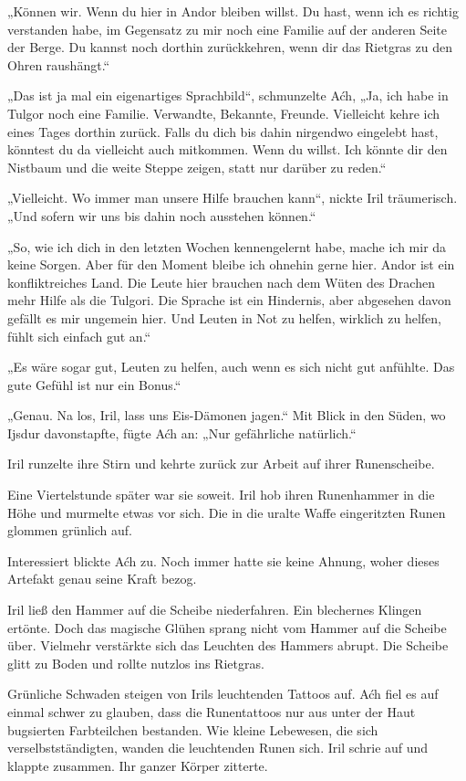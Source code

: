 „Können wir. Wenn du hier in Andor bleiben willst. Du hast, wenn ich es richtig verstanden habe, im Gegensatz zu mir noch eine Familie auf der anderen Seite der Berge. Du kannst noch dorthin zurückkehren, wenn dir das Rietgras zu den Ohren raushängt.“

„Das ist ja mal ein eigenartiges Sprachbild“, schmunzelte Aćh, „Ja, ich habe in Tulgor noch eine Familie. Verwandte, Bekannte, Freunde. Vielleicht kehre ich eines Tages dorthin zurück. Falls du dich bis dahin nirgendwo eingelebt hast, könntest du da vielleicht auch mitkommen. Wenn du willst. Ich könnte dir den Nistbaum und die weite Steppe zeigen, statt nur darüber zu reden.“

„Vielleicht. Wo immer man unsere Hilfe brauchen kann“, nickte Iril träumerisch. „Und sofern wir uns bis dahin noch ausstehen können.“

„So, wie ich dich in den letzten Wochen kennengelernt habe, mache ich mir da keine Sorgen. Aber für den Moment bleibe ich ohnehin gerne hier. Andor ist ein konfliktreiches Land. Die Leute hier brauchen nach dem Wüten des Drachen mehr Hilfe als die Tulgori. Die Sprache ist ein Hindernis, aber abgesehen davon gefällt es mir ungemein hier. Und Leuten in Not zu helfen, wirklich zu helfen, fühlt sich einfach gut an.“

„Es wäre sogar gut, Leuten zu helfen, auch wenn es sich nicht gut anfühlte. Das gute Gefühl ist nur ein Bonus.“

„Genau. Na los, Iril, lass uns Eis-Dämonen jagen.“ Mit Blick in den Süden, wo Ijsdur davonstapfte, fügte Aćh an: „Nur gefährliche natürlich.“

Iril runzelte ihre Stirn und kehrte zurück zur Arbeit auf ihrer Runenscheibe.

Eine Viertelstunde später war sie soweit. Iril hob ihren Runenhammer in die Höhe und murmelte etwas vor sich. Die in die uralte Waffe eingeritzten Runen glommen grünlich auf.

Interessiert blickte Aćh zu. Noch immer hatte sie keine Ahnung, woher dieses Artefakt genau seine Kraft bezog.

Iril ließ den Hammer auf die Scheibe niederfahren. Ein blechernes Klingen ertönte. Doch das magische Glühen sprang nicht vom Hammer auf die Scheibe über. Vielmehr verstärkte sich das Leuchten des Hammers abrupt. Die Scheibe glitt zu Boden und rollte nutzlos ins Rietgras.

Grünliche Schwaden steigen von Irils leuchtenden Tattoos auf. Aćh fiel es auf einmal schwer zu glauben, dass die Runentattoos nur aus unter der Haut bugsierten Farbteilchen bestanden. Wie kleine Lebewesen, die sich verselbstständigten, wanden die leuchtenden Runen sich. Iril schrie auf und klappte zusammen. Ihr ganzer Körper zitterte.

